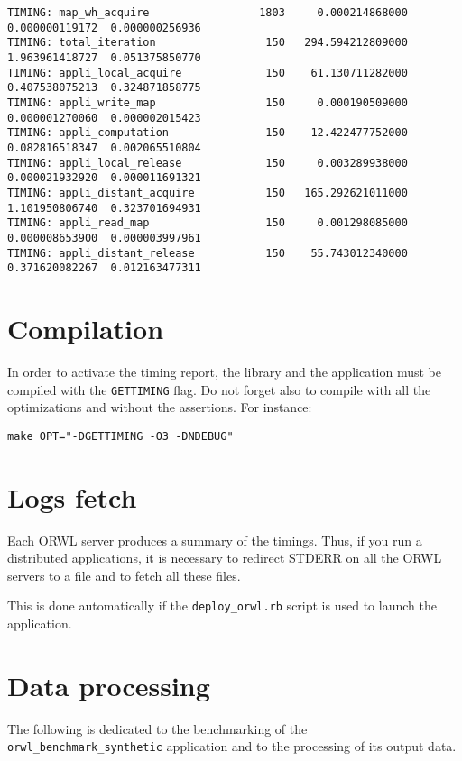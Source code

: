 \documentclass[10pt]{article}
\begin{document}
\begin{scriptsize}
\begin{verbatim}
TIMING: map_wh_acquire                 1803     0.000214868000    0.000000119172  0.000000256936
TIMING: total_iteration                 150   294.594212809000    1.963961418727  0.051375850770
TIMING: appli_local_acquire             150    61.130711282000    0.407538075213  0.324871858775
TIMING: appli_write_map                 150     0.000190509000    0.000001270060  0.000002015423
TIMING: appli_computation               150    12.422477752000    0.082816518347  0.002065510804
TIMING: appli_local_release             150     0.003289938000    0.000021932920  0.000011691321
TIMING: appli_distant_acquire           150   165.292621011000    1.101950806740  0.323701694931
TIMING: appli_read_map                  150     0.001298085000    0.000008653900  0.000003997961
TIMING: appli_distant_release           150    55.743012340000    0.371620082267  0.012163477311
\end{verbatim}
\end{scriptsize}

\section{Compilation}
In order to activate the timing report, the library and the
application must be compiled with the \texttt{GETTIMING} flag. Do not
forget also to compile with all the optimizations and without the
assertions. For instance:
\begin{verbatim}
make OPT="-DGETTIMING -O3 -DNDEBUG"
\end{verbatim}

\section{Logs fetch}
Each ORWL server produces a summary of the timings. Thus, if you run a
distributed applications, it is necessary to redirect STDERR on all
the ORWL servers to a file and to fetch all these files.

This is done automatically if the \texttt{deploy\_orwl.rb} script is
used to launch the application.

\section{Data processing}
The following is dedicated to the benchmarking of the
\texttt{orwl\_benchmark\_synthetic} application and to the processing
of its output data.
\end{document}
